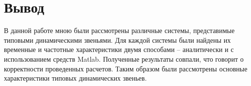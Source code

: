 
\FloatBarrier

\FloatBarrier

\FloatBarrier

\FloatBarrier

\FloatBarrier
\section{Вывод}
В данной работе мною были рассмотрены различные системы, представимые типовыми 
динамическими звеньями. Для каждой системы были найдены их временные и частотные 
характеристики двумя способами -- аналитически и с использованием средств Matlab. 
Полученные результаты совпали, что говорит о корректности проведенных расчетов. 
Таким образом были рассмотрены основные характеристики типовых динамических звеньев.